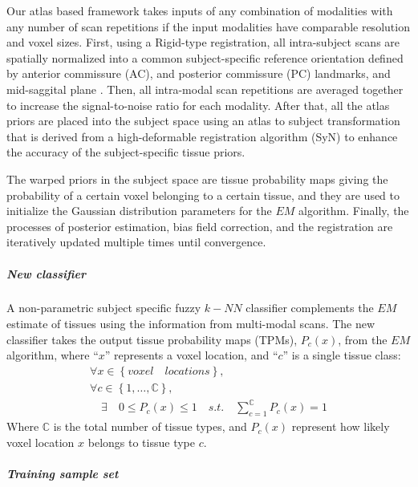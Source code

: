 Our atlas based framework takes inputs of any combination of modalities with any number of scan repetitions if the input modalities have comparable resolution and voxel sizes. 
First, using a Rigid-type registration, all intra-subject scans are spatially normalized into a common subject-specific reference orientation defined by anterior commissure (AC), and posterior commissure (PC) landmarks, and mid-saggital plane \cite{Ghayoor13}.
Then, all intra-modal scan repetitions are averaged together to increase the signal-to-noise ratio for each modality.
After that, all the atlas priors are placed into the subject space using an atlas to subject transformation that is derived from a high-deformable registration algorithm (SyN) \cite{Avants2008b,avants2009advanced} to enhance the accuracy of the subject-specific tissue priors.

The warped priors in the subject space are tissue probability maps giving the probability of a certain voxel belonging to a certain tissue, and they are used to initialize the Gaussian distribution parameters for the $EM$ algorithm. Finally, the processes of posterior estimation, bias field correction, and the registration are iteratively updated multiple times until convergence.

\subparagraph{New classifier} %

A non-parametric subject specific fuzzy $k-NN$ classifier complements the $EM$ estimate of tissues using the information from multi-modal scans. The new classifier takes the output tissue probability maps (TPMs), $P_{c}(x)$, from the $EM$ algorithm, where ``$x$'' represents a voxel location, and ``$c$'' is a single tissue class:
\begin{equation}
\begin{gathered}
\forall x\in \left\{voxel \quad locations\right\}, \\
\forall c\in \left\{1,\ldots, \mathbb{C}\right\}, \\
\quad \exists \quad 0 \leq P_c(x) \leq 1 \quad s.t. \quad
\sum^{\mathbb{C}}_{c=1}P_c(x)=1
\end{gathered}
\end{equation}
Where $\mathbb{C}$ is the total number of tissue types, and $P_{c}(x)$ represent how likely voxel location $x$ belongs to tissue type $c$.

\subparagraph*{Training sample set} %

